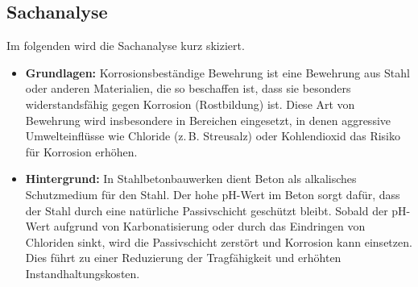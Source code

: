 \documentclass[
11pt,
captions=tableheading,
headsepline,
footsepline, 
captions=tableheading,
parskip=half-,
]{scrartcl}
\begin{document}

%
\subsection*{Sachanalyse}
\label{sec:Sachanalyse}
Im folgenden wird die Sachanalyse kurz skiziert.


\begin{itemize}
    \item \textbf{Grundlagen:} Korrosionsbeständige Bewehrung ist eine Bewehrung aus Stahl oder anderen Materialien, die so beschaffen ist, dass sie besonders widerstandsfähig gegen Korrosion (Rostbildung) ist. Diese Art von Bewehrung wird insbesondere in Bereichen eingesetzt, in denen aggressive Umwelteinflüsse wie Chloride (z.\,B. Streusalz) oder Kohlendioxid das Risiko für Korrosion erhöhen.
    
    \item \textbf{Hintergrund:} In Stahlbetonbauwerken dient Beton als alkalisches Schutzmedium für den Stahl. Der hohe pH-Wert im Beton sorgt dafür, dass der Stahl durch eine natürliche Passivschicht geschützt bleibt. Sobald der pH-Wert aufgrund von Karbonatisierung oder durch das Eindringen von Chloriden sinkt, wird die Passivschicht zerstört und Korrosion kann einsetzen. Dies führt zu einer Reduzierung der Tragfähigkeit und erhöhten Instandhaltungskosten.


\end{itemize}
\end{document}
